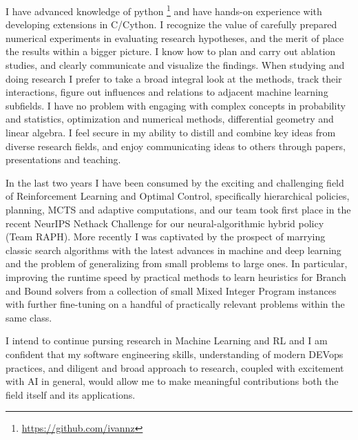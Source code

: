 \documentclass[14pt]{letter}
\begin{document}
I have advanced knowledge of python%
\footnote{
    \url{https://github.com/ivannz}
}
and have hands-on experience with developing extensions in C/Cython.
%
I recognize the value of carefully prepared numerical experiments in evaluating research
hypotheses, and the merit of place the results within a bigger picture. I know how to
plan and carry out ablation studies, and clearly communicate and visualize the findings.
%
When studying and doing research I prefer to take a broad integral look at the methods,
track their interactions, figure out influences and relations to adjacent machine learning
subfields.
%
I have no problem with engaging with complex concepts in probability and statistics,
optimization and numerical methods, differential geometry and linear algebra.
%
I feel secure in my ability to distill and combine key ideas from diverse research fields,
and enjoy communicating ideas to others through papers, presentations and teaching.
\par\medskip

In the last two years I have been consumed by the exciting and challenging field of Reinforcement
Learning and Optimal Control, specifically hierarchical policies, planning, MCTS and adaptive
computations, and our team took first place in the recent NeurIPS Nethack Challenge for
our neural-algorithmic hybrid policy (Team RAPH). More recently I was captivated by the
prospect of marrying classic search algorithms with the latest advances in machine and deep
learning and the problem of generalizing from small problems to large ones. In particular,
improving the runtime speed by practical methods to learn heuristics for Branch and Bound
solvers from a collection of small Mixed Integer Program instances with further fine-tuning
on a handful of practically relevant problems within the same class.

I intend to continue pursing research in Machine Learning and RL and I am confident that my
software engineering skills, understanding of modern DEVops practices, and diligent and broad
approach to research, coupled with excitement with AI in general, would allow me to make
meaningful contributions both the field itself and its applications.
\par\medskip

\end{document}
